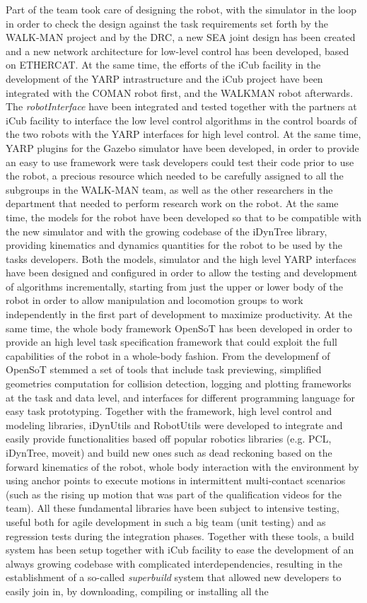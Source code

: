 \documentclass[%
	paper=A4,					%
	twoside=true,				%
	openright,			.
	parskip=full,				%
	chapterprefix=true,			%
	11pt,						%
	headings=normal,			%
	bibliography=totoc,			%
	listof=totoc,				%
	titlepage=on,				%
	captions=tableabove,		%
	draft=true,				%
]{scrreprt}%
\begin{document}
Part of the team took care of designing the robot, with the simulator in the loop in order to check the design against the task requirements set forth by the WALK-MAN project and by the DRC, a new SEA joint design has been created and a new network architecture for low-level control has been developed, based on ETHERCAT. At the same time, the efforts of the iCub facility in the development of the YARP intrastructure and the iCub project have been integrated with the COMAN robot first, and the WALKMAN robot afterwards. The \emph{robotInterface} have been integrated and tested together with the partners at iCub facility to interface the low level control algorithms in the control boards of the two robots with the YARP interfaces for high level control. At the same time, YARP plugins for the Gazebo simulator have been developed, in order to provide an easy to use framework were task developers could test their code prior to use the robot, a precious resource which needed to be carefully assigned to all the subgroups in the WALK-MAN team, as well as the other researchers in the department that needed to perform research work on the robot. At the same time, the models for the robot have been developed so that to be compatible with the new simulator and with the growing codebase of the iDynTree library, providing kinematics and dynamics quantities for the robot to be used by the tasks developers. Both the models, simulator and the high level YARP interfaces have been designed and configured in order to allow the testing and development of algorithms incrementally, starting from just the upper or lower body of the robot in order to allow manipulation and locomotion groups to work independently in the first part of development to maximize productivity. At the same time, the whole body framework OpenSoT has been developed in order to provide an high level task specification framework that could exploit the full capabilities of the robot in a whole-body fashion. From the developmenf of OpenSoT stemmed a set of tools that include task previewing, simplified geometries computation for collision detection, logging and plotting frameworks at the task and data level, and interfaces for different programming language for easy task prototyping. Together with the framework, high level control and modeling libraries, iDynUtils and RobotUtils were developed to integrate and easily provide functionalities based off popular robotics libraries (e.g. PCL, iDynTree, moveit) and build new ones such as dead reckoning based on the forward kinematics of the robot, whole body interaction with the environment by using anchor points to execute motions in intermittent multi-contact scenarios (such as the rising up motion that was part of the qualification videos for the team). All these fundamental libraries have been subject to intensive testing, useful both for agile development in such a big team (unit testing) and as regression tests during the integration phases. Together with these tools, a build system has been setup together with iCub facility to ease the development of an always growing codebase with complicated interdependencies, resulting in the establishment of a so-called \emph{superbuild} system that allowed new developers to easily join in, by downloading, compiling or installing all the 
\end{document}
